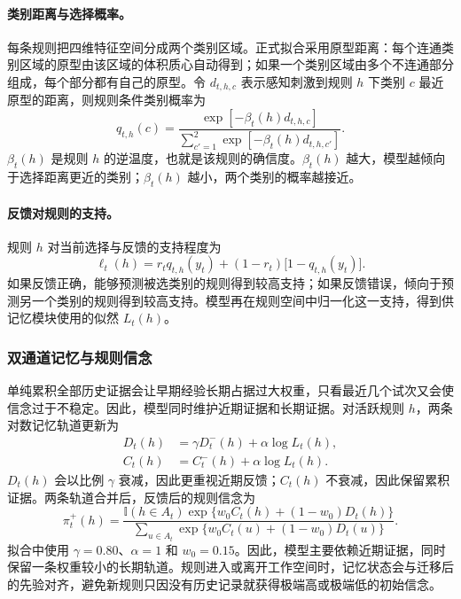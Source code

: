 \paragraph{类别距离与选择概率。}
每条规则把四维特征空间分成两个类别区域。正式拟合采用原型距离：每个连通类别区域的原型由该区域的体积质心自动得到；如果一个类别区域由多个不连通部分组成，每个部分都有自己的原型。令 $d_{t,h,c}$ 表示感知刺激到规则 $h$ 下类别 $c$ 最近原型的距离，则规则条件类别概率为
\begin{equation}
q_{t,h}(c)
=
\frac{\exp[-\beta_t(h)d_{t,h,c}]}
{\sum_{c'=1}^{2}\exp[-\beta_t(h)d_{t,h,c'}]}.
\label{eq:dynamic-rule-choice}
\end{equation}
$\beta_t(h)$ 是规则 $h$ 的逆温度，也就是该规则的确信度。$\beta_t(h)$ 越大，模型越倾向于选择距离更近的类别；$\beta_t(h)$ 越小，两个类别的概率越接近。

\paragraph{反馈对规则的支持。}
规则 $h$ 对当前选择与反馈的支持程度为
\begin{equation}
\ell_t(h)
=r_tq_{t,h}(y_t)
+(1-r_t)\bigl[1-q_{t,h}(y_t)\bigr].
\label{eq:dynamic-feedback-support}
\end{equation}
如果反馈正确，能够预测被选类别的规则得到较高支持；如果反馈错误，倾向于预测另一个类别的规则得到较高支持。模型再在规则空间中归一化这一支持，得到供记忆模块使用的似然 $L_t(h)$。


\subsubsection{双通道记忆与规则信念}

单纯累积全部历史证据会让早期经验长期占据过大权重，只看最近几个试次又会使信念过于不稳定。因此，模型同时维护近期证据和长期证据。对活跃规则 $h$，两条对数记忆轨道更新为
\begin{align}
D_t(h)
&=\gamma D_t^{-}(h)+\alpha\log L_t(h),
\nonumber\\
C_t(h)
&=C_t^{-}(h)+\alpha\log L_t(h).
\label{eq:dynamic-dual-memory}
\end{align}
$D_t(h)$ 会以比例 $\gamma$ 衰减，因此更重视近期反馈；$C_t(h)$ 不衰减，因此保留累积证据。两条轨道合并后，反馈后的规则信念为
\begin{equation}
\pi_t^{+}(h)
=
\frac{\mathbb I(h\in A_t)
\exp\{w_0C_t(h)+(1-w_0)D_t(h)\}}
{\sum_{u\in A_t}
\exp\{w_0C_t(u)+(1-w_0)D_t(u)\}}.
\label{eq:dynamic-memory-posterior}
\end{equation}
拟合中使用 $\gamma=0.80$、$\alpha=1$ 和 $w_0=0.15$。因此，模型主要依赖近期证据，同时保留一条权重较小的长期轨道。规则进入或离开工作空间时，记忆状态会与迁移后的先验对齐，避免新规则只因没有历史记录就获得极端高或极端低的初始信念。


